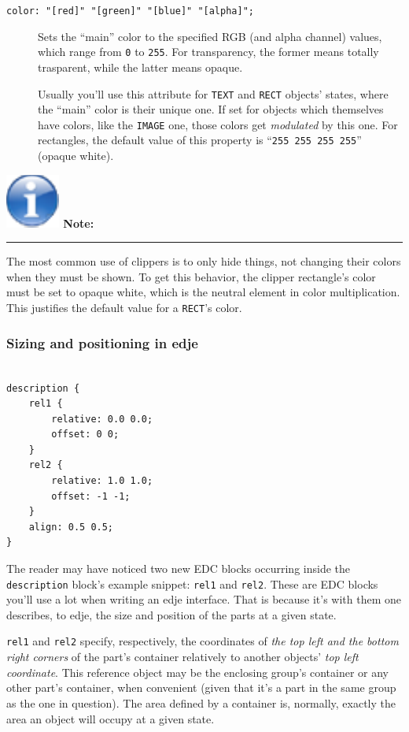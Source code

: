 \documentclass[a4paper]{profusion}
\newenvironment{myboxenv}[1]
  {
    \begin{flushright}
      \begin{boxedminipage}{0.9\textwidth}
        \textbf{%
          \large #1:}

        \hspace{-5pt}\rule{0.3\textwidth}{0.5pt}
        \begin{center}
          \begin{minipage}{0.95\textwidth}

            \small%
         }
          {
          \end{minipage}
        \end{center}
      \end{boxedminipage}
    \end{flushright}
 }
\newenvironment{note}
  {
    \begin{myboxenv}{
        \includegraphics[scale=0.4]{images/note.pdf}
        Note}
   }
    {
    \end{myboxenv}
 }
\begin{document}
\begin{description}
\item[\texttt{color: "[red]" "[green]" "[blue]" "[alpha]";}] Sets the
  ``main'' color to the specified RGB (and alpha channel) values,
  which range from \texttt{0} to \texttt{255}. For transparency, the
  former means totally trasparent, while the latter means opaque.

  Usually you'll use this attribute for \texttt{TEXT} and
  \texttt{RECT} objects' states, where the ``main'' color is their
  unique one. If set for objects which themselves have colors, like
  the \texttt{IMAGE} one, those colors get \emph{modulated} by this
  one. For rectangles, the default value of this property is
  ``\texttt{255 255 255 255}'' (opaque white).
\end{description}

\begin{note}
The most common use of clippers is to only hide things, not changing
their colors when they must be shown. To get this behavior, the
clipper rectangle's color must be set to opaque white, which is the
neutral element in color multiplication. This justifies the default
value for a \texttt{RECT}'s color.
\end{note}

\subsubsection{Sizing and positioning in edje}
\label{sec:positioning}


\begin{lstlisting}

description {
    rel1 {
        relative: 0.0 0.0;
        offset: 0 0;
    }
    rel2 {
        relative: 1.0 1.0;
        offset: -1 -1;
    }
    align: 0.5 0.5;
}
\end{lstlisting}

The reader may have noticed two new EDC blocks occurring inside the
\texttt{description} block's example snippet: \texttt{rel1} and
\texttt{rel2}. These are EDC blocks you'll use a lot when writing an
edje interface. That is because it's with them one describes, to edje,
the size and position of the parts at a given state.

\texttt{rel1} and \texttt{rel2} specify, respectively, the coordinates
of \emph{the top left and the bottom right corners} of the part's
container relatively to another objects' \emph{top left coordinate}.
This reference object may be the enclosing group's container or any
other part's container, when convenient (given that it's a part in the
same group as the one in question). The area defined by a container
is, normally, exactly the area an object will occupy at a given state.
\end{document}
